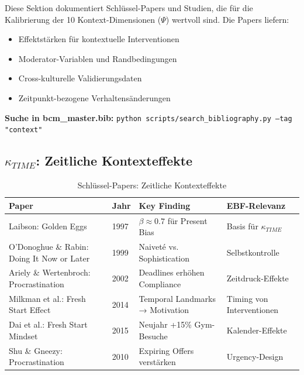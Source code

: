 \begin{tcolorbox}[colback=purple!5!white, colframe=purple!75!black,
    title=\textbf{Wissenschaftliche Evidenzbasis für Ψ-Kalibrierung}]

Diese Sektion dokumentiert Schlüssel-Papers und Studien, die für die Kalibrierung
der 10 Kontext-Dimensionen ($\Psi$) wertvoll sind. Die Papers liefern:
\begin{itemize}[nosep]
    \item Effektstärken für kontextuelle Interventionen
    \item Moderator-Variablen und Randbedingungen
    \item Cross-kulturelle Validierungsdaten
    \item Zeitpunkt-bezogene Verhaltensänderungen
\end{itemize}

\textbf{Suche in bcm\_master.bib:} \texttt{python scripts/search\_bibliography.py --tag "context"}

\end{tcolorbox}

\subsection{$\kappa_{TIME}$: Zeitliche Kontexteffekte}

\begin{table}[htbp]
\centering
\caption{Schlüssel-Papers: Zeitliche Kontexteffekte}
\label{tab:dr-papers-time}
\renewcommand{\arraystretch}{1.2}
\scriptsize
\begin{tabular}{@{}p{3.5cm}p{2cm}p{4cm}p{3cm}@{}}
\toprule
\textbf{Paper} & \textbf{Jahr} & \textbf{Key Finding} & \textbf{EBF-Relevanz} \\
\midrule
Laibson: Golden Eggs & 1997 & $\beta \approx 0.7$ für Present Bias & Basis für $\kappa_{TIME}$ \\
O'Donoghue \& Rabin: Doing It Now or Later & 1999 & Naiveté vs. Sophistication & Selbstkontrolle \\
Ariely \& Wertenbroch: Procrastination & 2002 & Deadlines erhöhen Compliance & Zeitdruck-Effekte \\
Milkman et al.: Fresh Start Effect & 2014 & Temporal Landmarks → Motivation & Timing von Interventionen \\
Dai et al.: Fresh Start Mindset & 2015 & Neujahr +15\% Gym-Besuche & Kalender-Effekte \\
Shu \& Gneezy: Procrastination & 2010 & Expiring Offers verstärken & Urgency-Design \\
\bottomrule
\end{tabular}
\end{table}

